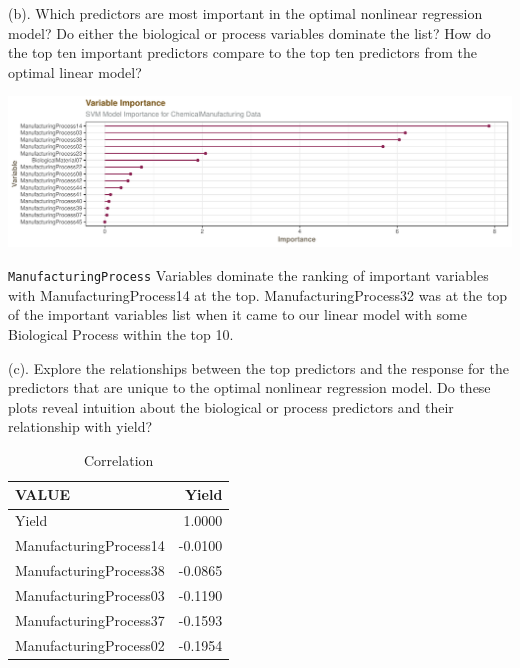 \documentclass[]{report}
\begin{document}
\begin{subquestion}{(b).}
Which predictors are most important in the optimal nonlinear regression model? Do either the biological or process variables dominate the list? How do the top ten important predictors compare to the top ten predictors from the optimal linear model? 
\end{subquestion}

\includegraphics{Homework-Two_files/figure-latex/kj-7.5b-1.pdf}

\texttt{ManufacturingProcess} Variables dominate the ranking of
important variables with ManufacturingProcess14 at the top.
ManufacturingProcess32 was at the top of the important variables list
when it came to our linear model with some Biological Process within the
top 10.

\begin{subquestion}{(c).}
Explore the relationships between the top predictors and the response for the predictors that are unique to the optimal nonlinear regression model. Do these plots reveal intuition about the biological or process predictors and their relationship with yield?
\end{subquestion}

\begin{table}[H]

\caption{\label{tab:unnamed-chunk-1}Correlation}
\centering
\fontsize{8}{10}\selectfont
\begin{tabular}[t]{l|r}
\hline
VALUE & Yield\\
\hline
\rowcolor{gray!6}  Yield & 1.0000\\
\hline
ManufacturingProcess14 & -0.0100\\
\hline
\rowcolor{gray!6}  ManufacturingProcess38 & -0.0865\\
\hline
ManufacturingProcess03 & -0.1190\\
\hline
\rowcolor{gray!6}  ManufacturingProcess37 & -0.1593\\
\hline
ManufacturingProcess02 & -0.1954\\
\hline
\end{tabular}
\end{table}
\end{document}
